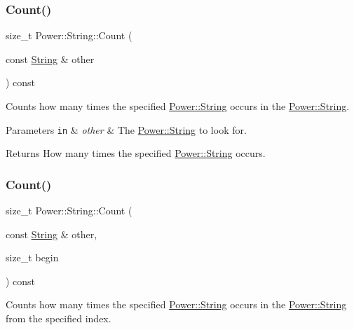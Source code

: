 \subsubsection{\texorpdfstring{Count()}{Count()}\hspace{0.1cm}{\footnotesize\ttfamily [1/12]}}
{\footnotesize\ttfamily size\+\_\+t Power\+::\+String\+::\+Count (\begin{DoxyParamCaption}\item[{const \hyperlink{class_power_1_1_string}{String} \&}]{other }\end{DoxyParamCaption}) const\hspace{0.3cm}{\ttfamily [inline]}}



Counts how many times the specified \hyperlink{class_power_1_1_string}{Power\+::\+String} occurs in the \hyperlink{class_power_1_1_string}{Power\+::\+String}. 


\begin{DoxyParams}[1]{Parameters}
\mbox{\tt in}  & {\em other} & The \hyperlink{class_power_1_1_string}{Power\+::\+String} to look for. \\
\hline
\end{DoxyParams}
\begin{DoxyReturn}{Returns}
How many times the specified \hyperlink{class_power_1_1_string}{Power\+::\+String} occurs. 
\end{DoxyReturn}
\mbox{\label{class_power_1_1_string_ab34fca570ebdd78be571f6df62ea3b55}} 
\subsubsection{\texorpdfstring{Count()}{Count()}\hspace{0.1cm}{\footnotesize\ttfamily [2/12]}}
{\footnotesize\ttfamily size\+\_\+t Power\+::\+String\+::\+Count (\begin{DoxyParamCaption}\item[{const \hyperlink{class_power_1_1_string}{String} \&}]{other,  }\item[{size\+\_\+t}]{begin }\end{DoxyParamCaption}) const\hspace{0.3cm}{\ttfamily [inline]}}



Counts how many times the specified \hyperlink{class_power_1_1_string}{Power\+::\+String} occurs in the \hyperlink{class_power_1_1_string}{Power\+::\+String} from the specified index. 


